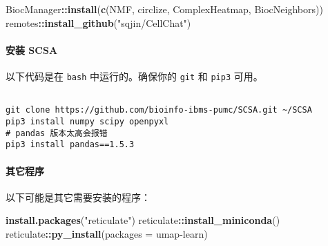 \documentclass[
]{article}
\newenvironment{Shaded}{\begin{snugshade}}{\end{snugshade}}
\newcommand{\DataTypeTok}[1]{\textcolor[rgb]{0.13,0.29,0.53}{#1}}
\newcommand{\KeywordTok}[1]{\textcolor[rgb]{0.13,0.29,0.53}{\textbf{#1}}}
\newcommand{\NormalTok}[1]{#1}
\newcommand{\OperatorTok}[1]{\textcolor[rgb]{0.81,0.36,0.00}{\textbf{#1}}}
\newcommand{\StringTok}[1]{\textcolor[rgb]{0.31,0.60,0.02}{#1}}
\begin{document}
\begin{Shaded}
\begin{Highlighting}[]
\NormalTok{BiocManager}\OperatorTok{::}\KeywordTok{install}\NormalTok{(}\KeywordTok{c}\NormalTok{(}\StringTok{\textquotesingle{}NMF\textquotesingle{}}\NormalTok{, }\StringTok{\textquotesingle{}circlize\textquotesingle{}}\NormalTok{, }\StringTok{\textquotesingle{}ComplexHeatmap\textquotesingle{}}\NormalTok{, }\StringTok{\textquotesingle{}BiocNeighbors\textquotesingle{}}\NormalTok{))}
\NormalTok{remotes}\OperatorTok{::}\KeywordTok{install\_github}\NormalTok{(}\StringTok{"sqjin/CellChat"}\NormalTok{)}
\end{Highlighting}
\end{Shaded}

\hypertarget{ux5b89ux88c5-scsa}{%
\paragraph{安装 SCSA}\label{ux5b89ux88c5-scsa}}

以下代码是在 \texttt{bash} 中运行的。确保你的 \texttt{git} 和 \texttt{pip3} 可用。

\begin{tcolorbox}[colback = gray!10, colframe = red!50, width = 16cm, arc = 1mm, auto outer arc, title = {Bash input}]
\begin{verbatim}

git clone https://github.com/bioinfo-ibms-pumc/SCSA.git ~/SCSA
pip3 install numpy scipy openpyxl
# pandas 版本太高会报错
pip3 install pandas==1.5.3

\end{verbatim}
\end{tcolorbox}

\hypertarget{installOthers}{%
\paragraph{其它程序}\label{installOthers}}

以下可能是其它需要安装的程序：

\begin{Shaded}
\begin{Highlighting}[]
\KeywordTok{install.packages}\NormalTok{(}\StringTok{"reticulate"}\NormalTok{)}
\NormalTok{reticulate}\OperatorTok{::}\KeywordTok{install\_miniconda}\NormalTok{()}
\NormalTok{reticulate}\OperatorTok{::}\KeywordTok{py\_install}\NormalTok{(}\DataTypeTok{packages =} \StringTok{\textquotesingle{}umap{-}learn\textquotesingle{}}\NormalTok{)}
\end{Highlighting}
\end{Shaded}
\end{document}
